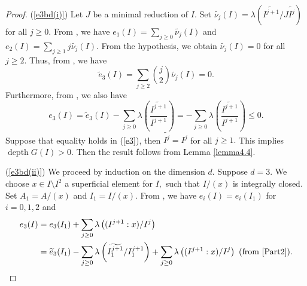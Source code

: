 \documentclass[10pt,a4paper]{amsart}
\newcommand{\depth}{\operatorname{depth}}
\newcommand{\wt}{\widetilde}
\begin{document}
\begin{proof} 


   (\ref{e3bd(i)}) Let $J$ be a minimal reduction of $I.$ Set $\wt{\nu_j}(I)=\lambda(\wt{I^{j+1}}/J\wt{I^j})$ for all $j\geq 0.$ From \cite[Equation 3.1]{rossi2010hilbert}, we have $e_1(I)=\sum_{j\geq 0}\wt{\nu_j}(I)$ and $e_2(I)=\sum_{j\geq 1}j\wt{\nu_j}(I).$ From the hypothesis, we obtain $\wt{\nu_j}(I)=0$ for all $j\geq 2.$ Thus, from \cite[Theorem 2.5$(c)$]{rossi2010hilbert}, we have
\begin{equation}\label{al}
    \wt{e}_{3}(I)=\displaystyle \sum _{j \geq 2}\binom{j}{2}\wt{\nu_j}(I)=0.
\end{equation}
 Furthermore, from \cite[1.5$(b)$]{Part2}, we also have
\begin{equation} \label{e3}
    e_{3}(I)=\wt{e}_{3}(I)-\sum_{j\geq 0}\lambda\left(\frac{\widetilde{I^{j+1}}}{I^{j+1}}\right)=-\sum_{j\geq 0}\lambda\left(\frac{\widetilde{I^{j+1}}}{I^{j+1}}\right)\leq 0.
\end{equation}
    Suppose that equality holds in (\ref{e3}), then $\widetilde{I^{j}}=I^{j}$ for all $j \geq 1.$ This implies $\depth G(I) >0.$ Then the result follows from Lemma \ref{lemma4.4}.


\noindent
(\ref{e3bd(ii)}) We proceed by induction on the dimension $d$. Suppose $d=3.$ We choose $x \in I\setminus I^2$ a superficial element for $I,$ such that $I/(x)$ is integrally closed. Set ${A_1}=A/(x)$ and ${I_1}=I/(x)$. From \cite[Proposition 1.2]{rossi2010hilbert}, we have $e_i(I)=e_i(I_1)$ for $i=0,1,2$ and
   \begin{align} \nonumber \label{123}
       e_{3}(I)&=e_{3}({I_1})+\sum_{j\geq 0}\lambda\left((I^{j+1}:x)/I^{j}\right)\\
       &=\widetilde{e}_{3}({I_1})-\sum_{j\geq 0}\lambda\left(\widetilde{{I^{j+1}_1}}/{I^{j+1}_1}\right)+\sum_{j\geq 0}\lambda\left((I^{j+1}:x)/I^{j}\right) \text{ (from \cite[1.5$(b)$]{Part2})}.
   \end{align}
    

\end{proof}
\end{document}

